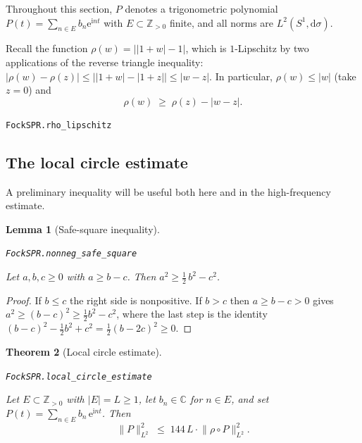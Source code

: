 \documentclass[11pt]{amsart}
\newtheorem{theorem}{Theorem}[section]
\newtheorem{lemma}[theorem]{Lemma}
\theoremstyle{definition}
\theoremstyle{remark}
\begin{document}
Throughout this section, $P$ denotes a trigonometric polynomial
$P(t) = \sum_{n \in E} b_n \mathrm{e}^{\mathrm{i} nt}$ with $E \subset \mathbb{Z}_{>0}$ finite,
and all norms are $L^2(S^1, \mathrm{d}\sigma)$.

Recall the function $\rho(w) = \bigl\lvert \lvert 1+w \rvert - 1 \bigr\rvert$,
which is $1$-Lipschitz by two applications of the reverse triangle inequality:
$\lvert \rho(w) - \rho(z) \rvert
\le \bigl\lvert \lvert 1+w \rvert - \lvert 1+z \rvert \bigr\rvert
\le \lvert w - z \rvert$.
In particular, $\rho(w) \le \lvert w \rvert$ (take $z = 0$) and
\begin{equation}\label{eq:rho-lip}
\rho(w) \;\ge\; \rho(z) - \lvert w - z \rvert.
\end{equation}
\par\noindent\texttt{FockSPR.rho\_lipschitz}\par\smallskip

\subsection{The local circle estimate}\label{sec:local}

A preliminary inequality will be useful both here and in the high-frequency
estimate.

\begin{lemma}[Safe-square inequality]\label{lem:safe-square}
\par\noindent\texttt{FockSPR.nonneg\_safe\_square}\par\smallskip
Let $a, b, c \ge 0$ with $a \ge b - c$.  Then
$a^2 \ge \tfrac{1}{2}\, b^2 - c^2$.
\end{lemma}

\begin{proof}
If $b \le c$ the right side is nonpositive.  If $b > c$ then
$a \ge b-c > 0$ gives $a^2 \ge (b-c)^2 \ge \tfrac{1}{2}b^2 - c^2$, where
the last step is the identity
$(b-c)^2 - \tfrac{1}{2}b^2 + c^2 = \tfrac{1}{2}(b-2c)^2 \ge 0$.
\end{proof}

\begin{theorem}[Local circle estimate]\label{thm:local-circle}
\par\noindent\texttt{FockSPR.local\_circle\_estimate}\par\smallskip
Let $E \subset \mathbb{Z}_{>0}$ with $\lvert E \rvert = L \ge 1$, let $b_n \in \mathbb{C}$ for
$n \in E$, and set $P(t) = \sum_{n \in E} b_n\,\mathrm{e}^{\mathrm{i} nt}$.  Then
\[
\lVert P \rVert_{L^2}^2
\;\le\;
144\, L \cdot \lVert \rho \circ P \rVert_{L^2}^2.
\]
\end{theorem}
\end{document}
